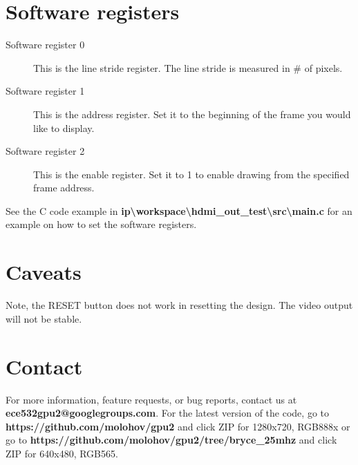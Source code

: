 \documentclass[12pt]{article}
\begin{document}
  \section{Software registers}
  \begin{description}
    \item[Software register 0] This is the line stride register. The line stride is measured in \# of pixels.
    \item[Software register 1] This is the address register. Set it to the beginning of the frame you would like to display.
    \item[Software register 2] This is the enable register. Set it to 1 to enable drawing from the specified frame address.
  \end{description}
  See the C code example in \textbf {ip\textbackslash{}workspace\textbackslash{}hdmi\_out\_test\textbackslash{}src\textbackslash{}main.c} for an example on how to set the software registers.
  \section{Caveats}
  Note, the RESET button does not work in resetting the design. The video output will not be stable.
  \section{Contact}
  For more information, feature requests, or bug reports, contact us at\\ \textbf {ece532gpu2@googlegroups.com}. For the latest version of the code, go to \textbf {https://github.com/molohov/gpu2} and click ZIP for 1280x720, RGB888x or go to \textbf {https://github.com/molohov/gpu2/tree/bryce\_25mhz} and click ZIP for 640x480, RGB565.
\end{document}
